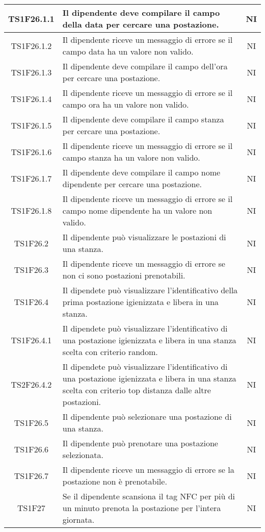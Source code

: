 \begin{center}
\begin{longtable}{|c|p{10cm}|c|}
			\hline
			TS1F26.1.1 & Il dipendente deve compilare il campo della data per cercare una postazione. & NI \\	
			\hline
			TS1F26.1.2 & Il dipendente riceve un messaggio di errore se il campo data ha un valore non valido. & NI \\	
			\hline
			TS1F26.1.3 & Il dipendente deve compilare il campo dell'ora per cercare una postazione. & NI \\	
			\hline
			TS1F26.1.4 & Il dipendente riceve un messaggio di errore se il campo ora ha un valore non valido. & NI \\	
			\hline			
			TS1F26.1.5 & Il dipendente deve compilare il campo stanza per cercare una postazione. & NI \\	
			\hline
			TS1F26.1.6 & Il dipendente riceve un messaggio di errore se il campo stanza ha un valore non valido. & NI \\	
			\hline			
			TS1F26.1.7 & Il dipendente deve compilare il campo nome dipendente per cercare una postazione. & NI \\	
			\hline
			TS1F26.1.8 & Il dipendente riceve un messaggio di errore se il campo nome dipendente ha un valore non valido. & NI \\	
			\hline
			TS1F26.2 & Il dipendente può visualizzare le postazioni di una stanza. & NI \\	
			\hline
			TS1F26.3 & Il dipendente riceve un messaggio di errore se non ci sono postazioni prenotabili. & NI \\	
			\hline
			TS1F26.4 & Il dipendete può visualizzare l'identificativo della prima postazione igienizzata e libera in una stanza. & NI \\	
			\hline
			TS1F26.4.1 & Il dipendete può visualizzare l'identificativo di una postazione igienizzata e libera in una stanza scelta con criterio random. & NI \\	
			\hline
			TS2F26.4.2 & Il dipendete può visualizzare l'identificativo di una postazione igienizzata e libera in una stanza scelta con criterio top distanza dalle altre postazioni. & NI \\	
			\hline
			TS1F26.5 & Il dipendente può selezionare una postazione di una stanza. & NI \\	
			\hline
			TS1F26.6 & Il dipendente può prenotare una postazione selezionata. & NI \\	
			\hline
			TS1F26.7 & Il dipendente riceve un messaggio di errore se la postazione non è prenotabile. & NI \\	
			\hline
			TS1F27 & Se il dipendente scansiona il tag NFC per più di un minuto prenota la postazione per l'intera giornata. & NI \\	

\end{longtable}
\end{center}
